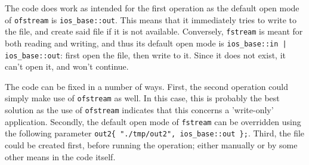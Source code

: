 The code does work as intended for the first operation as the default open mode of \texttt{ofstream} is \texttt{ios\_base::out}. This means that it immediately tries to write to the file, and create said file if it is not available. Conversely, \texttt{fstream} is meant for both reading and writing, and thus its default open mode is \texttt{ios\_base::in | ios\_base::out}: first open the file, then write to it. Since it does not exist, it can't open it, and won't continue.

The code can be fixed in a number of ways. First, the second operation could simply make use of \texttt{ofstream} as well. In this case, this is probably the best solution as the use of \texttt{ofstream} indicates that this concerns a 'write-only' application. Secondly, the default open mode of \texttt{fstream} can be overridden using the following parameter \texttt{out2\{ "./tmp/out2", ios\_base::out \};}. Third, the file could be created first, before running the operation; either manually or by some other means in the code itself.
